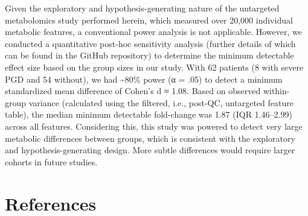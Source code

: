 \documentclass[
]{article}
\begin{document}
Given the exploratory and hypothesis-generating nature of the untargeted
metabolomics study performed herein, which measured over 20,000
individual metabolic features, a conventional power analysis is not
applicable. However, we conducted a quantitative post-hoc sensitivity
analysis (further details of which can be found in the GitHub
repository) to determine the minimum detectable effect size based on the
group sizes in our study. With 62 patients (8 with severe PGD and 54
without), we had \textasciitilde80\% power (α = .05) to detect a minimum
standardized mean difference of Cohen's d ≈ 1.08. Based on observed
within-group variance (calculated using the filtered, i.e., post-QC,
untargeted feature table), the median minimum detectable fold-change was
1.87 (IQR 1.46--2.99) across all features. Considering this, this study
was powered to detect very large metabolic differences between groups,
which is consistent with the exploratory and hypothesis-generating
design. More subtle differences would require larger cohorts in future
studies.

\newpage

\section*{\texorpdfstring{\textbf{References}}{References}}\label{references}
\end{document}
